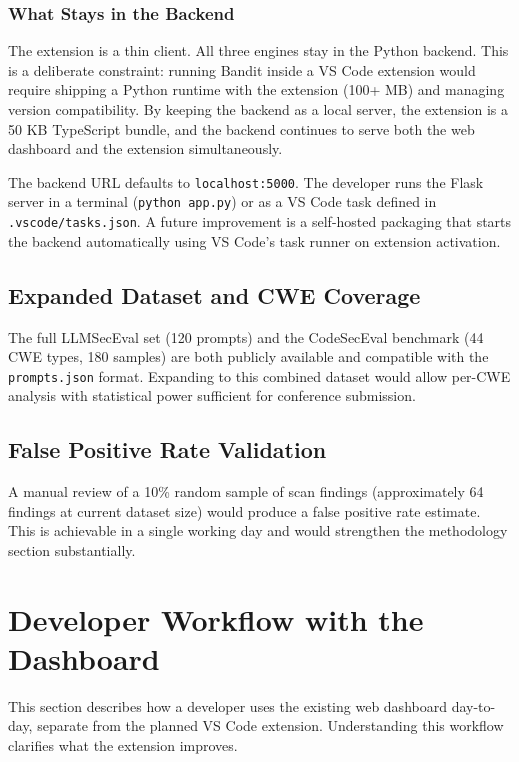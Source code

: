 \documentclass[12pt,a4paper]{report}
\begin{document}
\subsubsection{What Stays in the Backend}

The extension is a thin client. All three engines stay in the Python backend.
This is a deliberate constraint: running Bandit inside a VS Code extension would
require shipping a Python runtime with the extension (100+ MB) and managing
version compatibility. By keeping the backend as a local server, the extension
is a 50 KB TypeScript bundle, and the backend continues to serve both the web
dashboard and the extension simultaneously.

The backend URL defaults to \texttt{localhost:5000}. The developer runs the
Flask server in a terminal (\texttt{python app.py}) or as a VS Code task defined
in \texttt{.vscode/tasks.json}. A future improvement is a self-hosted packaging
that starts the backend automatically using VS Code's task runner on extension
activation.

\subsection{Expanded Dataset and CWE Coverage}

The full LLMSecEval set (120 prompts) and the CodeSecEval benchmark (44 CWE types,
180 samples) are both publicly available and compatible with the
\texttt{prompts.json} format. Expanding to this combined dataset would allow
per-CWE analysis with statistical power sufficient for conference submission.

\subsection{False Positive Rate Validation}

A manual review of a 10\% random sample of scan findings (approximately 64
findings at current dataset size) would produce a false positive rate estimate.
This is achievable in a single working day and would strengthen the methodology
section substantially.

\section{Developer Workflow with the Dashboard}
\label{sec:devworkflow}

This section describes how a developer uses the existing web dashboard day-to-day,
separate from the planned VS Code extension. Understanding this workflow clarifies
what the extension improves.
\end{document}
